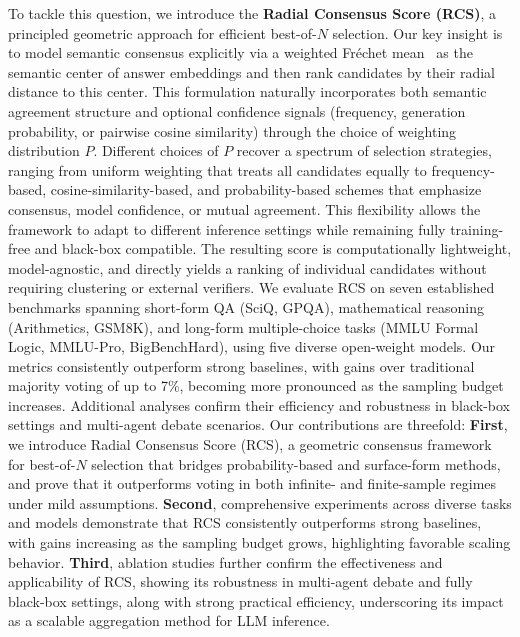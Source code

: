 To tackle this question, we introduce the \textbf{Radial Consensus Score (RCS)}, a principled geometric approach for efficient best-of-$N$ selection. 
Our key insight is to model semantic consensus explicitly via a weighted Fréchet mean~\citep{fletcher} as the semantic center of answer embeddings and then rank candidates by their radial distance to this center. 
This formulation naturally incorporates both semantic agreement structure and optional confidence signals (frequency, generation probability, or pairwise cosine similarity) through the choice of weighting distribution $P$.
Different choices of $P$ recover a spectrum of selection strategies, ranging from uniform weighting that treats all candidates equally to frequency-based, cosine-similarity-based, and probability-based schemes that emphasize consensus, model confidence, or mutual agreement. 
This flexibility allows the framework to adapt to different inference settings while remaining fully training-free and black-box compatible.
The resulting score is computationally lightweight, model-agnostic, and directly yields a ranking of individual candidates without requiring clustering or external verifiers.
We evaluate RCS on seven established benchmarks spanning short-form QA (SciQ, GPQA), mathematical reasoning (Arithmetics, GSM8K), and long-form multiple-choice tasks (MMLU Formal Logic, MMLU-Pro, BigBenchHard), using five diverse open-weight models. 
Our metrics consistently outperform strong baselines, with gains over traditional majority voting of up to 7\%, becoming more pronounced as the sampling budget increases. 
Additional analyses confirm their efficiency and robustness in black-box settings and multi-agent debate scenarios.
Our contributions are threefold:
\textbf{First}, we introduce Radial Consensus Score (RCS), a geometric consensus framework for best-of-$N$ selection that bridges probability-based and surface-form methods, and prove that it outperforms voting in both infinite- and finite-sample regimes under mild assumptions. %
\textbf{Second}, comprehensive experiments across diverse tasks and models demonstrate that RCS consistently outperforms strong baselines, with gains increasing as the sampling budget grows, highlighting favorable scaling behavior.
\textbf{Third}, ablation studies further confirm the effectiveness and applicability of RCS, showing its robustness in multi-agent debate and fully black-box settings, along with strong practical efficiency, underscoring its impact as a scalable aggregation method for LLM inference.


